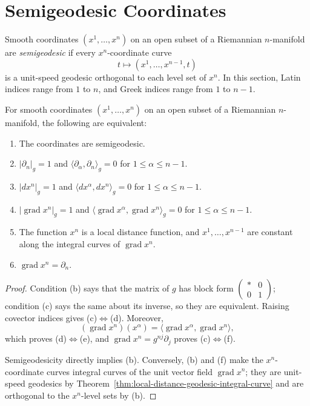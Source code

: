 \section{Semigeodesic Coordinates}

Smooth coordinates $(x^1,\ldots,x^n)$ on an open subset of a Riemannian
$n$-manifold are \emph{semigeodesic} if every $x^n$-coordinate curve
\[
t\longmapsto(x^1,\ldots,x^{n-1},t)
\]
is a unit-speed geodesic orthogonal to each level set of $x^n$. In this
section, Latin indices range from $1$ to $n$, and Greek indices range from
$1$ to $n-1$.

\begin{proposition}
\label{prop:characterizations-semigeodetic-coordinates}

For smooth coordinates $(x^1,\ldots,x^n)$ on an open subset of a Riemannian
$n$-manifold, the following are equivalent:
\begin{enumerate}
\item[(a)] The coordinates are semigeodesic.
\item[(b)] $|\partial_n|_g=1$ and
$\langle\partial_\alpha,\partial_n\rangle_g=0$ for
$1\leq\alpha\leq n-1$.
\item[(c)] $|dx^n|_g=1$ and
$\langle dx^\alpha,dx^n\rangle_g=0$ for
$1\leq\alpha\leq n-1$.
\item[(d)] $|\operatorname{grad}x^n|_g=1$ and
$\langle\operatorname{grad}x^\alpha,\operatorname{grad}x^n\rangle_g=0$ for
$1\leq\alpha\leq n-1$.
\item[(e)] The function $x^n$ is a local distance function, and
$x^1,\ldots,x^{n-1}$ are constant along the integral curves of
$\operatorname{grad}x^n$.
\item[(f)] $\operatorname{grad}x^n=\partial_n$.
\end{enumerate}
\end{proposition}

\begin{proof}
\sketch Condition (b) says that the matrix of $g$ has block form
$\left(\begin{smallmatrix} *&0\\0&1\end{smallmatrix}\right)$; condition (c)
says the same about its inverse, so they are equivalent. Raising covector
indices gives (c)$\Leftrightarrow$(d). Moreover,
\[
(\operatorname{grad}x^n)(x^\alpha)
=\langle\operatorname{grad}x^\alpha,\operatorname{grad}x^n\rangle,
\]
which proves (d)$\Leftrightarrow$(e), and
$\operatorname{grad}x^n=g^{nj}\partial_j$ proves
(c)$\Leftrightarrow$(f).

Semigeodesicity directly implies (b). Conversely, (b) and (f) make the
$x^n$-coordinate curves integral curves of the unit vector field
$\operatorname{grad}x^n$; they are unit-speed geodesics by
Theorem~\ref{thm:local-distance-geodesic-integral-curve} and are orthogonal to
the $x^n$-level sets by (b).
\end{proof}

